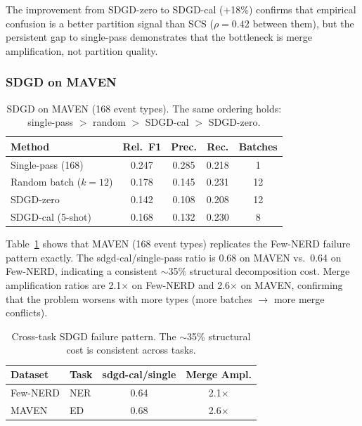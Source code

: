 \documentclass[11pt,a4paper]{article}
\begin{document}
The improvement from SDGD-zero to SDGD-cal (+18\%) confirms that empirical confusion is a better partition signal than SCS ($\rho{=}0.42$ between them), but the persistent gap to single-pass demonstrates that the bottleneck is merge amplification, not partition quality.

\subsubsection{SDGD on MAVEN}

\begin{table}[t]
\centering
\small
\begin{tabular}{lcccc}
\toprule
\textbf{Method} & \textbf{Rel.\ F1} & \textbf{Prec.} & \textbf{Rec.} & \textbf{Batches} \\
\midrule
Single-pass (168)     & 0.247 & 0.285 & 0.218 & 1 \\
Random batch ($k{=}12$)  & 0.178 & 0.145 & 0.231 & 12 \\
SDGD-zero             & 0.142 & 0.108 & 0.208 & 12 \\
SDGD-cal (5-shot)     & 0.168 & 0.132 & 0.230 & 8 \\
\bottomrule
\end{tabular}
\caption{SDGD on MAVEN (168 event types). The same ordering holds: single-pass $>$ random $>$ SDGD-cal $>$ SDGD-zero.}
\label{tab:sdgd-maven}
\end{table}

Table~\ref{tab:sdgd-maven} shows that MAVEN (168 event types) replicates the Few-NERD failure pattern exactly.
The sdgd-cal/single-pass ratio is 0.68 on MAVEN vs.\ 0.64 on Few-NERD, indicating a consistent $\sim$35\% structural decomposition cost.
Merge amplification ratios are 2.1$\times$ on Few-NERD and 2.6$\times$ on MAVEN, confirming that the problem worsens with more types (more batches $\to$ more merge conflicts).

\begin{table}[t]
\centering
\small
\begin{tabular}{llcc}
\toprule
\textbf{Dataset} & \textbf{Task} & \textbf{sdgd-cal/single} & \textbf{Merge Ampl.} \\
\midrule
Few-NERD & NER & 0.64 & 2.1$\times$ \\
MAVEN    & ED  & 0.68 & 2.6$\times$ \\
\bottomrule
\end{tabular}
\caption{Cross-task SDGD failure pattern. The $\sim$35\% structural cost is consistent across tasks.}
\label{tab:sdgd-cross-task}
\end{table}
\end{document}
